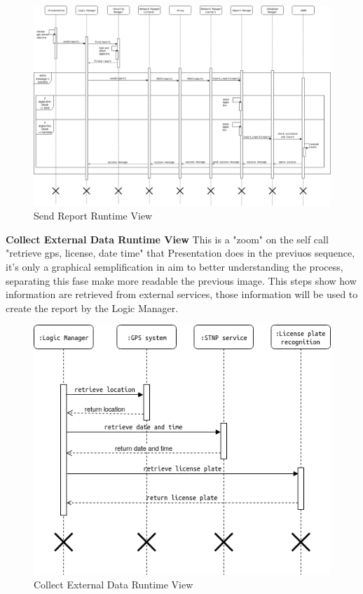 \documentclass{article}
\begin{document}
\begin{figure}[H]
    \centering
    \includegraphics[scale=0.4]{img/sequence_diagrams/send_report_sequence.png}
    \caption{Send Report Runtime View}
\end{figure}  

\textbf{Collect External Data Runtime View}  
This is a "zoom" on the self call "retrieve gps, license, date time" that Presentation does in the 
previuos sequence, it's only a graphical semplification in aim to better understanding the process, 
separating this fase make more readable the previous image. This steps show how information are 
retrieved from external services, those information will be used to create the report by the Logic Manager.

\begin{figure}[H]
    \centering
    \includegraphics[scale=0.4]{img/sequence_diagrams/collect_external_data_sequence.png}
    \caption{Collect External Data Runtime View}
\end{figure}
\end{document}
